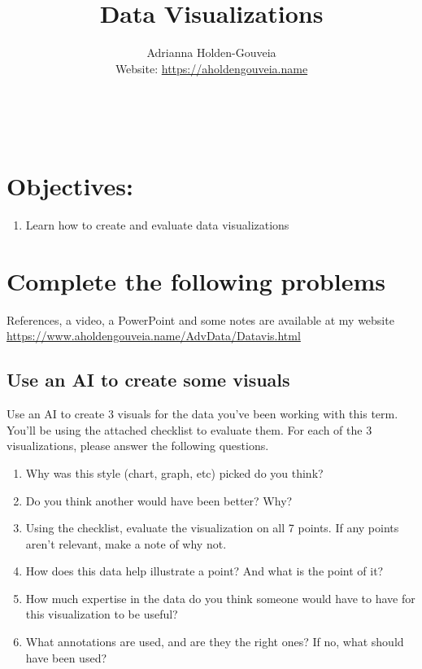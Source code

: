 \documentclass[12pt]{article}
\title{Data Visualizations}
\author{
        Adrianna Holden-Gouveia \\
        Website: \url{https://aholdengouveia.name}\\ 
        \date{\vspace{-5ex}}
        \faLinkedin{: aholdengouveia} \\
        \faGithub {: aholdengouveia} \\
        }
\begin{document}
    

\maketitle


\section*{Objectives:}
\begin{enumerate}
    \item Learn how to create and evaluate data visualizations
\end{enumerate}
\section*{Complete the following problems}

References, a video, a PowerPoint and some notes are available at my website
\url {https://www.aholdengouveia.name/AdvData/Datavis.html}

\subsection*{Use an AI to create some visuals}
Use an AI to create 3 visuals for the data you've been working with this term.  You'll be using the attached checklist to evaluate them.  For each of the 3 visualizations, please answer the following questions.
    \begin{enumerate}
        \item Why was this style (chart, graph, etc) picked do you think? 
        \item Do you think another would have been better? Why? 
        \item Using the checklist, evaluate the visualization on all 7 points.  If any points aren't relevant, make a note of why not.
        \item How does this data help illustrate a point? And what is the point of it?
        \item How much expertise in the data do you think someone would have to have for this visualization to be useful?
        \item What annotations are used, and are they the right ones? If no, what should have been used?
    \end{enumerate}
\end{document}
